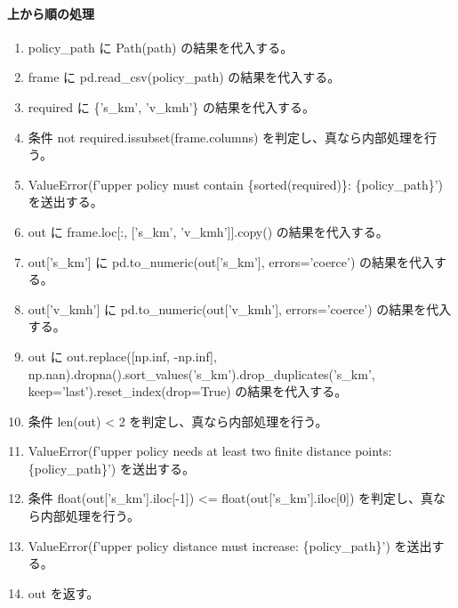 \documentclass[a4paper,11pt]{article}
\begin{document}
            \paragraph{上から順の処理}
            \begin{enumerate}[leftmargin=1.8em]
            \item policy\_path に Path(path) の結果を代入する。
\item frame に pd.read\_csv(policy\_path) の結果を代入する。
\item required に \{'s\_km', 'v\_kmh'\} の結果を代入する。
\item 条件 not required.issubset(frame.columns) を判定し、真なら内部処理を行う。
\item   ValueError(f'upper policy must contain \{sorted(required)\}: \{policy\_path\}') を送出する。
\item out に frame.loc[:, ['s\_km', 'v\_kmh']].copy() の結果を代入する。
\item out['s\_km'] に pd.to\_numeric(out['s\_km'], errors='coerce') の結果を代入する。
\item out['v\_kmh'] に pd.to\_numeric(out['v\_kmh'], errors='coerce') の結果を代入する。
\item out に out.replace([np.inf, -np.inf], np.nan).dropna().sort\_values('s\_km').drop\_duplicates('s\_km', keep='last').reset\_index(drop=True) の結果を代入する。
\item 条件 len(out) < 2 を判定し、真なら内部処理を行う。
\item   ValueError(f'upper policy needs at least two finite distance points: \{policy\_path\}') を送出する。
\item 条件 float(out['s\_km'].iloc[-1]) <= float(out['s\_km'].iloc[0]) を判定し、真なら内部処理を行う。
\item   ValueError(f'upper policy distance must increase: \{policy\_path\}') を送出する。
\item out を返す。
            \end{enumerate}
\end{document}
